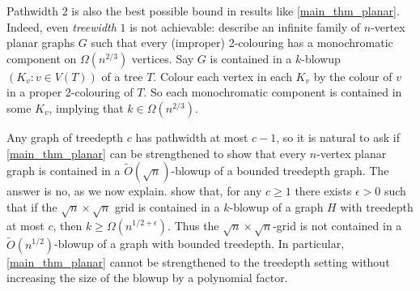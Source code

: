 \documentclass{patmorin}
\renewcommand{\geq}{\geqslant}
\renewcommand{\leq}{\leqslant}
\newcommand{\david}[1]{{\color{orange} David: #1}}
\newcommand{\pat}[1]{\textcolor{Blue}{Pat: #1}}
\DeclareMathOperator{\pw}{pw}
\begin{document}
Pathwidth $2$ is also the best possible bound in results like  \cref{main_thm_planar}.  Indeed, even \emph{treewidth} $1$ is not achievable:  \citet{LMST08} describe an infinite family of $n$-vertex planar graphs $G$ such that every (improper) 2-colouring has a monochromatic component on $\Omega(n^{2/3})$ vertices. Say $G$ is contained in a $k$-blowup $(K_v:v\in V(T))$ of a tree $T$. Colour each vertex in each $K_v$ by the colour of $v$ in a proper 2-colouring of $T$. So each monochromatic component is contained in some $K_v$, implying that $k\in\Omega(n^{2/3})$.


Any graph of treedepth $c$ has pathwidth at most $c-1$, so it is natural to ask if \cref{main_thm_planar} can be strengthened to show that every $n$-vertex planar graph is contained in a $\tilde{O}(\sqrt{n})$-blowup of a bounded treedepth graph.  The answer is no, as we now explain. \citet[Theorem~19]{DvoWoo} show that, for any $c\geq 1$ there exists $\epsilon>0$ such that if the $\sqrt{n}\times\sqrt{n}$ grid is contained in a $k$-blowup of a graph $H$ with treedepth at most $c$, then $k\geq\Omega(n^{1/2+\epsilon})$. Thus the $\sqrt{n}\times \sqrt{n}$-grid is not contained in a $\tilde{O}(n^{1/2})$-blowup of a graph with bounded treedepth.  In particular, \cref{main_thm_planar} cannot be strengthened to the treedepth setting without increasing the size of the blowup by a polynomial factor.


%
%
%
%
%
\end{document}
